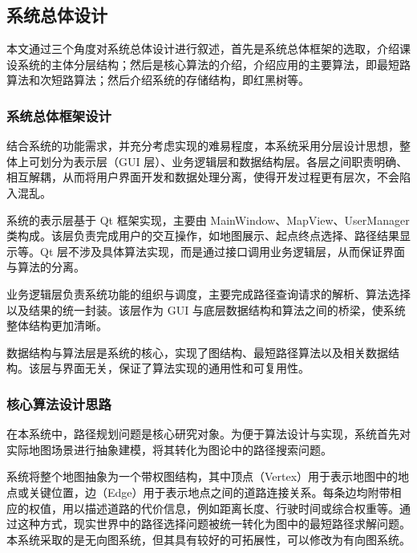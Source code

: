\documentclass[UTF8,12pt,a4paper]{ctexart}
\begin{document}
\subsection{系统总体设计}

本文通过三个角度对系统总体设计进行叙述，首先是系统总体框架的选取，介绍课设系统的主体分层结构；然后是核心算法的介绍，介绍应用的主要算法，即最短路算法和次短路算法；然后介绍系统的存储结构，即红黑树等。

\subsubsection{系统总体框架设计}

结合系统的功能需求，并充分考虑实现的难易程度，本系统采用分层设计思想，整体上可划分为表示层（GUI 层）、业务逻辑层和数据结构层。各层之间职责明确、相互解耦，从而将用户界面开发和数据处理分离，使得开发过程更有层次，不会陷入混乱。

\vspace{1em}

系统的表示层基于 Qt 框架实现，主要由 MainWindow、MapView、UserManager 类构成。该层负责完成用户的交互操作，如地图展示、起点终点选择、路径结果显示等。Qt 层不涉及具体算法实现，而是通过接口调用业务逻辑层，从而保证界面与算法的分离。

\vspace{1em}

业务逻辑层负责系统功能的组织与调度，主要完成路径查询请求的解析、算法选择以及结果的统一封装。该层作为 GUI 与底层数据结构和算法之间的桥梁，使系统整体结构更加清晰。

\vspace{1em}

数据结构与算法层是系统的核心，实现了图结构、最短路径算法以及相关数据结构。该层与界面无关，保证了算法实现的通用性和可复用性。

\subsubsection{核心算法设计思路}

\vspace{1em}

在本系统中，路径规划问题是核心研究对象。为便于算法设计与实现，系统首先对实际地图场景进行抽象建模，将其转化为图论中的路径搜索问题。

系统将整个地图抽象为一个带权图结构，其中顶点（Vertex）用于表示地图中的地点或关键位置，边（Edge）用于表示地点之间的道路连接关系。每条边均附带相应的权值，用以描述道路的代价信息，例如距离长度、行驶时间或综合权重等。通过这种方式，现实世界中的路径选择问题被统一转化为图中的最短路径求解问题。本系统采取的是无向图系统，但其具有较好的可拓展性，可以修改为有向图系统。
\end{document}
